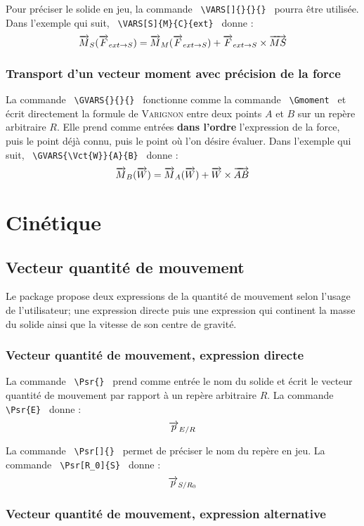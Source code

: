 \documentclass[12pt]{article}
\begin{document}
Pour préciser le solide en jeu, la commande \verb| \VARS[]{}{}{} | pourra être utilisée. Dans l'exemple qui suit, \verb| \VARS[S]{M}{C}{ext} | donne : $$\VARS[S]{M}{S}{ext}$$

\subsubsection{Transport d'un vecteur moment avec précision de la force}

La commande \verb| \GVARS{}{}{} | fonctionne comme la commande \verb| \Gmoment | et écrit directement la formule de \textsc{Varignon} entre deux points $A$ et $B$ sur un repère arbitraire $R$. Elle prend comme entrées \textbf{dans l'ordre} l'expression de la force, puis le point déjà connu, puis le point où l'on désire évaluer. Dans l'exemple qui suit, \verb| \GVARS{\Vct{W}}{A}{B} | donne : $$ \GVARS{\Vct{W}}{A}{B}$$

\newpage

\section{Cinétique}

\subsection{Vecteur quantité de mouvement}

Le package propose deux expressions de la quantité de mouvement selon l'usage de l'utilisateur; une expression directe puis une expression qui continent la masse du solide ainsi que la vitesse de son centre de gravité.

\subsubsection{Vecteur quantité de mouvement, expression directe}

La commande \verb| \Psr{} | prend comme entrée le nom du solide et écrit le vecteur quantité de mouvement par rapport à un repère arbitraire $R$. La commande  \verb| \Psr{E} | donne : $$\Psr{E}$$

La commande \verb| \Psr[]{} | permet de préciser le nom du repère en jeu. La commande  \verb| \Psr[R_0]{S} | donne : $$\Psr[R_0]{S}$$

\subsubsection{Vecteur quantité de mouvement, expression alternative}
\end{document}
